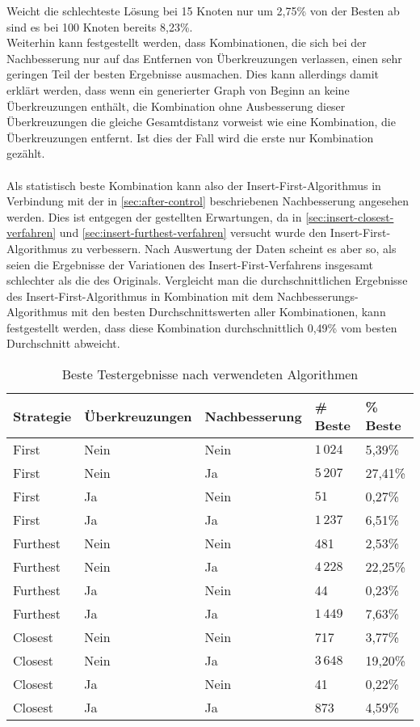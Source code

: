 Weicht die schlechteste Lösung bei 15 Knoten nur um 2,75\% von der Besten ab sind es bei 100 Knoten bereits 8,23\%.
\\
Weiterhin kann festgestellt werden, dass Kombinationen, die sich bei der Nachbesserung nur auf das Entfernen von Überkreuzungen verlassen, einen sehr geringen Teil der besten Ergebnisse ausmachen.
Dies kann allerdings damit erklärt werden, dass wenn ein generierter Graph von Beginn an keine Überkreuzungen enthält, die Kombination ohne Ausbesserung dieser Überkreuzungen die gleiche Gesamtdistanz vorweist wie eine Kombination, die Überkreuzungen entfernt.
Ist dies der Fall wird die erste nur Kombination gezählt.
\\\\
Als statistisch beste Kombination kann also der Insert-First-Algorithmus in Verbindung mit der in \vref{sec:after-control} beschriebenen Nachbesserung angesehen werden.
Dies ist entgegen der gestellten Erwartungen, da in \vref{sec:insert-closest-verfahren} und \vref{sec:insert-furthest-verfahren} versucht wurde den Insert-First-Algorithmus zu verbessern.
Nach Auswertung der Daten scheint es aber so, als seien die Ergebnisse der Variationen des Insert-First-Verfahrens insgesamt schlechter als die des Originals.
Vergleicht man die durchschnittlichen Ergebnisse des Insert-First-Algorithmus in Kombination mit dem Nachbesserungs-Algorithmus mit den besten Durchschnittswerten aller Kombinationen, kann festgestellt werden, dass diese Kombination durchschnittlich 0,49\% vom besten Durchschnitt abweicht.



\begin{center}
    \begin{table}
\begin{tabular}{ l | l | l | l | l }
\textbf{Strategie} & \textbf{Überkreuzungen} & \textbf{Nachbesserung} & \textbf{\# Beste} & \textbf{\% Beste} \\ \hline
First & Nein & Nein & $1\,024$ & 5,39\% \\
First & Nein & Ja & $5\,207$ & 27,41\% \\
First & Ja & Nein & $51$ &  0,27\% \\
First & Ja & Ja & $1\,237$ & 6,51\% \\ \hline
Furthest & Nein & Nein &  481 & 2,53\% \\
Furthest & Nein & Ja & $4\,228$ & 22,25\% \\
Furthest & Ja & Nein & 44 & 0,23\% \\
Furthest & Ja & Ja & $1\,449$ & 7,63\% \\ \hline
Closest & Nein & Nein & 717 & 3,77\% \\
Closest & Nein & Ja & $3\,648$ & 19,20\% \\
Closest & Ja & Nein & 41 & 0,22\% \\
Closest & Ja & Ja & 873 & 4,59\% \\ \hline
\end{tabular}
\caption{Beste Testergebnisse nach verwendeten Algorithmen}
\label{tab:test-results1}
\end{table}
\end{center}

